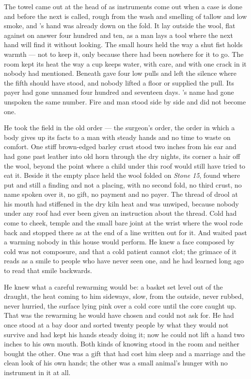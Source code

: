 
The towel came out at the head of  as instruments come out when a case is done and before the next is called, rough from the wash and smelling of tallow and low smoke, and 's hand was already down on the fold. It lay outside the wool, flat against  on answer four hundred and ten, as a man lays a tool where the next hand will find it without looking. The small hours held  the way a shut fist holds warmth --- not to keep it, only because there had been nowhere for it to go. The room kept its heat the way a cup keeps water, with care, and with one crack in it nobody had mentioned. Beneath   gave four low pulls and left the silence where the fifth should have stood, and nobody lifted a floor or supplied the pull. Its payer had gone unnamed four hundred and seventeen days. 's name had gone unspoken the same number. Fire and man stood side by side and did not become one.

He took the field in the old order --- the surgeon's order, the order in which a body gives up its facts to a man with steady hands and no time to waste on comfort. One stiff brown-edged barley crust stood two inches from his ear and had gone past leather into old horn through the dry nights, its corner a hair off the wool, beyond the point where a child under this roof would still have tried to eat it. Beside it the empty place held the wool folded on \emph{Stone 15}, found where put and still a finding and not a placing, with no second fold, no third crust, no name spoken over it, no gift, no payment and no payer. The thread of drool at his mouth had stiffened in the dry kiln heat and was unwiped, because nobody under any roof had ever been given an instruction about the thread. Cold had come to cheek, temple and the small bare joint at the wrist where the wool rode back and stopped there as at the end of a line written out for it. And  waited past a warming nobody in this house would perform. He knew a face composed by cold was not composure, and that a cold patient cannot clot; the grimace of it reads as a smile to people who have never seen one, and he had learned long ago to read that smile backwards.

He knew what a careful rewarming would be: a basket set level out of the draught, the heat coming to him sideways, slow, from the outside, never rubbed, never hurried, the surface lying pink over a cold core until the core caught up. That was the rewarming he would have chosen and could not ask for. He had once stood at a bay door and sorted twenty people by what they would not survive and had kept his hands steady doing it; now he could not lift a hand two inches to his own mouth. Both kinds of knowing stood in the room and neither bought the other. One was a gift that had cost him sleep and a marriage and the clean look of his own hands; the other was a small animal's hunger with no instrument in it at all.

